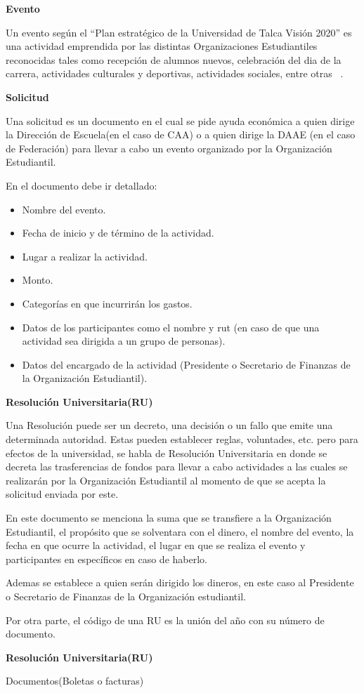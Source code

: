 \textbf{Evento}

  Un evento según el ``Plan estratégico de la Universidad de Talca Visión 2020'' es una actividad emprendida por las distintas Organizaciones Estudiantiles reconocidas tales como recepción de alumnos nuevos, celebración del dia de la carrera, actividades culturales y deportivas, actividades sociales, entre otras ~\cite{5}. 

\textbf{Solicitud}

  Una solicitud es un documento en el cual se pide ayuda económica a quien dirige la Dirección de Escuela(en el caso de CAA) o a quien dirige la DAAE (en el caso de Federación) para llevar a cabo un evento organizado por la Organización Estudiantil. 

  En el documento debe ir detallado:
  \begin{itemize}
      \item Nombre del evento.
      \item Fecha de inicio y de término de la actividad.
      \item Lugar a realizar la actividad. 
      \item Monto. 
      \item Categorías en que incurrirán los gastos.
      \item Datos de los participantes como el nombre y rut (en caso de que una actividad sea dirigida a un grupo de personas). 
      \item Datos del encargado de la actividad (Presidente o Secretario de Finanzas de la Organización Estudiantil).
  \end{itemize}

\textbf{Resolución Universitaria(RU)}

  Una Resolución puede ser un decreto, una decisión o un fallo que emite una determinada autoridad. Estas pueden establecer reglas, voluntades, etc. pero para efectos de la universidad, se habla de Resolución Universitaria en donde se decreta las trasferencias de fondos para llevar a cabo actividades a las cuales se realizarán por la Organización Estudiantil al momento de que se acepta la solicitud enviada por este.

  En este documento se menciona la suma que se transfiere a la Organización Estudiantil, el propósito que se solventara con el dinero, el nombre del evento, la fecha en que ocurre la actividad, el lugar en que se realiza el evento y participantes en específicos en caso de haberlo.

  Ademas se establece a quien serán dirigido los dineros, en este caso al Presidente o Secretario de Finanzas de la Organización estudiantil.

  Por otra parte, el código de una RU es la unión del año con su número de documento. 

\textbf{Resolución Universitaria(RU)}

  Documentos(Boletas o facturas)
